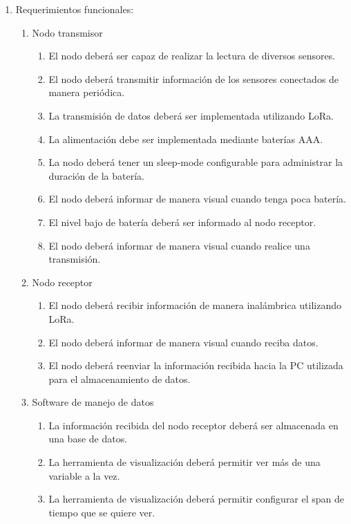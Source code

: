 \documentclass[11pt]{charter}
\begin{document}
\begin{enumerate}
\item Requerimientos funcionales:
	\begin{enumerate}
	\item Nodo transmisor
		\begin{enumerate}[label*=\arabic*.]
		\item El nodo deberá ser capaz de realizar la lectura de diversos sensores.
		\item El nodo deberá transmitir información de los sensores conectados de manera periódica.
		\item La transmisión de datos deberá ser implementada utilizando LoRa.
		\item La alimentación debe ser implementada mediante baterías AAA.
		\item La nodo deberá tener un sleep-mode configurable para administrar la duración de la batería.
		\item El nodo deberá informar de manera visual cuando tenga poca batería.
		\item El nivel bajo de batería deberá ser informado al nodo receptor.
		\item El nodo deberá informar de manera visual cuando realice una transmisión.
		\end{enumerate}
	\item Nodo receptor
		\begin{enumerate}[label*=\arabic*.]
		\item El nodo deberá recibir información de manera inalámbrica utilizando LoRa.
		\item El nodo deberá informar de manera visual cuando reciba datos.
		\item El nodo deberá reenviar la información recibida hacia la PC utilizada para el almacenamiento de datos.
		\end{enumerate}
	\item Software de manejo de datos
		\begin{enumerate}[label*=\arabic*.]
		\item La información recibida del nodo receptor deberá ser almacenada en una base de datos.
		\item La herramienta de visualización deberá permitir ver más de una variable a la vez.
		\item La herramienta de visualización deberá permitir configurar el span de tiempo que se quiere ver.
		\end{enumerate}
	\end{enumerate}

\end{enumerate}
\end{document}
